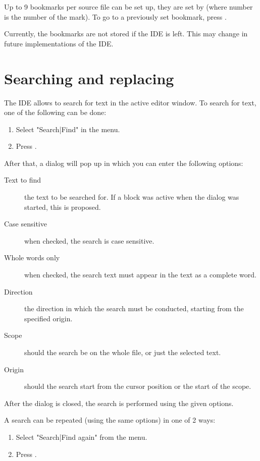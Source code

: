 Up to 9 bookmarks per source file can be set up, they are set by
 (where number is the number of the mark).
To go to a previously set bookmark, press .

\begin{remark}
Currently, the bookmarks are not stored if the IDE is left. This may
change in future implementations of the IDE.
\end{remark}

\section{Searching and replacing}
\label{se:searching}
The IDE allows to search for text in the active editor window. 
To search for text, one  of the following can be done:
\begin{enumerate}
\item Select "Search|Find" in the menu.
\item Press .
\end{enumerate}
After that, a dialog will pop up in which you can enter the following
options:
\begin{description}
\item[Text to find] the text to be searched for. If a block was active when
the dialog was started, this is proposed.
\item[Case sensitive] when checked, the search is case sensitive.
\item[Whole words only] when checked, the search text must appear in the
text as a complete word.
\item[Direction] the direction in which the search must be conducted,
starting from the specified origin.
\item[Scope] should the search be on the whole file, or just the selected
text.
\item[Origin] should the search start from the cursor position or the start
of the scope.
\end{description}
After the dialog is closed, the search is performed using the given options.

A search can be repeated (using the same options) in one of 2 ways:
\begin{enumerate}
\item Select "Search|Find again" from the menu.
\item Press .
\end{enumerate}

